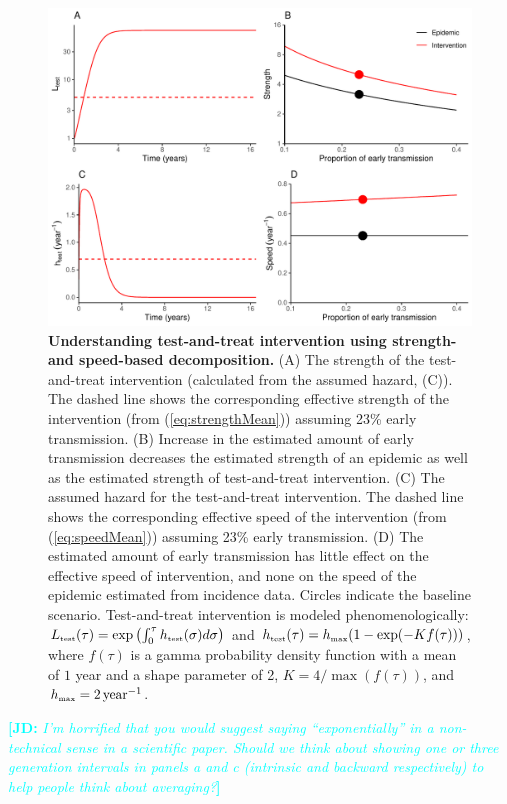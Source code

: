 \documentclass[12pt]{article}
\newcommand{\comment}[3]{\textcolor{#1}{\textbf{[#2: }\textit{#3}\textbf{]}}}
\newcommand{\jd}[1]{\comment{cyan}{JD}{#1}}
\newcommand{\tsub}[2]{#1_{{\textrm{\tiny #2}}}}
\newcommand{\figlab}[1]{\label{fig:#1}}
\newcommand{\eqref}[1]{(\ref{eq:#1})}
\begin{document}
\begin{figure}[!t]
\includegraphics[width=\textwidth]{../figure/test_and_treat.pdf}
\caption{
\textbf{Understanding test-and-treat intervention using strength- and speed-based decomposition.}
(A) The strength of the test-and-treat intervention (calculated from the assumed hazard, (C)). The dashed line shows the corresponding effective strength of the intervention (from \eqref{strengthMean}) assuming 23\% early transmission.
(B) Increase in the estimated amount of early transmission decreases the estimated strength of an epidemic as well as the estimated strength of test-and-treat intervention.
(C) The assumed hazard for the test-and-treat intervention. 
The dashed line shows the corresponding effective speed of the intervention (from \eqref{speedMean}) assuming 23\% early transmission.
(D) The estimated amount of early transmission has little effect on the effective speed of intervention, and none on the speed of the epidemic estimated from incidence data.
Circles indicate the baseline scenario.
Test-and-treat intervention is modeled phenomenologically: $\tsub{L}{test}(\tau) = \exp\left(\int_0^\tau \tsub{h}{test}(\sigma) d\sigma \right)$ and $\tsub{h}{test}(\tau) = \tsub{h}{max} (1 - \exp(- K f(\tau)))$, where $f(\tau)$ is a gamma probability density function with a mean of $1$ year and a shape parameter of 2, $K = 4/\max(f(\tau))$, and $\tsub{h}{max} = 2\,\mathrm{year}^{-1}$.
}
\figlab{test}
\end{figure}

\jd{I'm horrified that you would suggest saying ``exponentially'' in a non-technical sense in a scientific paper. Should we think about showing one or three generation intervals in panels a and c (intrinsic and backward respectively) to help people think about averaging?}
\end{document}
